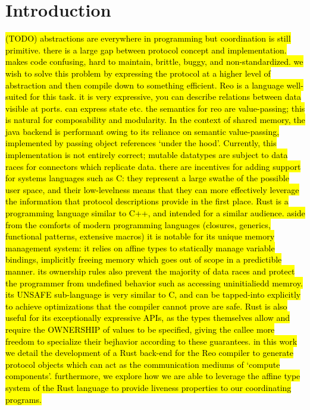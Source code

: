 \chapter{Introduction}
\hl{
(TODO)
abstractions are everywhere in programming but coordination is still primitive.
there is a large gap between protocol concept and implementation. makes code confusing, hard to maintain, brittle, buggy, and non-standardized.
we wish to solve this problem by expressing the protocol at a higher level of abstraction and then compile down to something efficient.
Reo is a language well-suited for this task. it is very expressive, you can describe relations between data visible at ports. can express state etc.
the semantics for reo are value-passing; this is natural for composability and modularity.
In the context of shared memory, the java backend is performant owing to its reliance on semantic value-passing, implemented by passing object references `under the hood'. Currently, this implementation is not entirely correct; mutable datatypes are subject to data races for connectors which replicate data.
there are incentives for adding support for systems languages such as C: they represent a large swathe of the possible user space, and their low-levelness means that they can more effectively leverage the information that protocol descriptions provide in the first place.
Rust is a programming language similar to C++, and intended for a similar audience. aside from the comforts of modern programming languages (closures, generics, functional patterns, extensive macros) it is notable for its unique memory management system: it relies on affine types to statically manage variable bindings, implicitly freeing memory which goes out of scope in a predictible manner. its ownership rules also prevent the majority of data races and protect the programmer from undefined behavior such as accessing uninitialiedd memroy. its UNSAFE sub-language is very similar to C, and can be tapped-into explicitly to achieve optimizations that the compiler cannot prove are safe. Rust is also useful for its exceptionally expressive APIs, as the types themselves allow and require the OWNERSHIP of values to be specified, giving the callee more freedom to specialize their bejhavior according to these guarantees. 
in this work we detail the development of a Rust back-end for the Reo compiler to generate protocol objects which can act as the communication mediums of `compute components'.
furthermore, we explore how we are able to leverage the affine type system of the Rust language to provide liveness properties to our coordinating programs.
}

